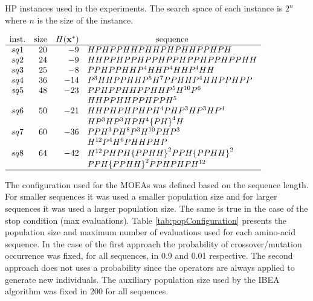 \begin{table}[]
	\begin{center}
		\caption{HP instances used in the experiments. The search space of each instance is $2^n$ where $n$ is the size of
			the instance.}
		\label{tab:instances}
		{$\begin{array}{c r r l}
			\text{inst.} & \text{size} &  \multicolumn{1}{ c }{H({\bf{x}}^*)} & \multicolumn{1}{c}{\text{sequence}} \\ \hline
			sq1 &20 &-9 & HPHPPHHPHHPHPHHPPHPH \\
			sq2 &24 &-9 & HHPPHPPHPPHPPHPPHPPHPPHH \\
			sq3 &25 &-8 & PPHPPHHP^4HHP^4HHP^4HH \\
			sq4 &36 &-14 &  P^3HHPPHHP^5H^7PPHHP^4HHPPHPP\\
			sq5 &48 &-23 &  PPHPPHHPPHHP^5H^{10}P^6 \\
			&   &    &  HHPPHHPPHPPH^5 \\
			sq6 &50 &-21 &  HHPHPHPHPH^4PHP^3HP^3HP^4 \\
			&   &    & HP^3HP^3HPH^4{\{PH\}}^4H\\
			sq7 &60 &-36 &  PPH^3PH^8P^3H^{10}PHP^3\\
			&   &    &  H^{12}P^4H^6PHHPHP\\
			sq8 &64 &-42 &   H^{12}PHPH{\{PPHH\}}^2PPH{\{PPHH\}}^2\\
			&   &    &  PPH{\{PPHH\}}^2PPHPHPH^{12}\\
			\hline
			\end{array}$}
	\end{center}
\end{table}

The configuration used for the MOEAs was defined based on the sequence length. For smaller sequences it was used a smaller population size and for larger sequences it was used a larger population size. The same is true in the case of the stop condition (max evaluations). Table \ref{tab:popConfiguration} presents the population size and maximum number of evaluations used for each amino-acid sequence. In the case of the first approach the probability of crossover/mutation occurrence was fixed, for all sequences, in 0.9 and 0.01 respective. The second approach does not uses a probability since the operators are always applied to generate new individuals. The auxiliary population size used by the IBEA algorithm was fixed in 200 for all sequences.   
%

